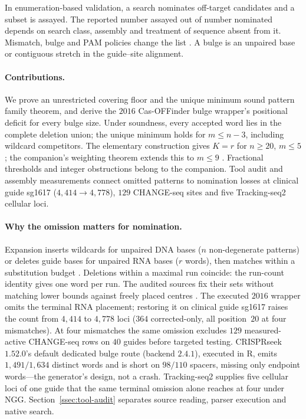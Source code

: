 \label{sec:intro}
In enumeration-based validation, a search nominates off-target candidates and a subset
is assayed. The reported number assayed out of number nominated depends on search
class, assembly and treatment of sequence absent from it. Mismatch, bulge and PAM
policies change the list \citep{kalter2025offtarget,park2016casoffinderbulge}.
A bulge is an unpaired base or contiguous stretch in the guide--site alignment.

\paragraph{Contributions.}
We prove an unrestricted covering floor and the unique minimum sound pattern family
theorem, and derive the $2016$ Cas-OFFinder bulge wrapper's
\citep{bae2014casoffinder} positional deficit for every bulge size. Under soundness, every accepted word lies in the complete deletion union; the
unique minimum holds for $m\le n-3$, including wildcard competitors. The elementary
construction gives $K=r$ for $n\ge20$, $m\le5$; the companion's weighting theorem extends
this to $m\le9$ \citep{companion_reach}. Fractional thresholds and integer obstructions
belong to the companion. Tool audit and assembly measurements connect omitted patterns to
nomination losses at clinical guide sg1617 ($4{,}414\to4{,}778$), $129$ CHANGE-seq
\citep{lazzarotto2020changeseq} sites and five Tracking-seq2 cellular loci.

\paragraph{Why the omission matters for nomination.}
Expansion inserts wildcards for unpaired DNA bases ($n$ non-degenerate patterns) or
deletes guide bases for unpaired RNA bases ($r$ words), then matches within a substitution
budget \citep{park2016casoffinderbulge}. Deletions within a maximal run coincide: the
run-count identity gives one word per run. The audited sources fix their sets without
matching lower bounds against freely placed centres
\citep{park2016casoffinderbulge,casoffinder_source}. The executed $2016$ wrapper omits the
terminal RNA placement; restoring it on clinical guide sg1617 raises the count from
$4{,}414$ to $4{,}778$ loci ($364$ corrected-only, all position~$20$ at four mismatches).
At four mismatches the same omission excludes $129$ measured-active CHANGE-seq rows on
$40$ guides before targeted testing. CRISPRseek $1.52.0$'s default dedicated bulge route
(backend $2.4.1$), executed in R, emits $1{,}491/1{,}634$ distinct words and is short on
$98/110$ spacers, missing only endpoint words---the generator's design, not a crash.
Tracking-seq2 \citep{cong2026tracking2} supplies five cellular loci of one guide that the
same terminal omission alone reaches at four under NGG. Section~\ref{ssec:tool-audit}
separates source reading, parser execution and native search.

